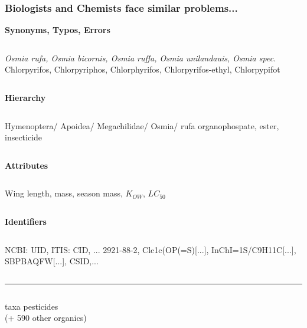 \documentclass[12pt, t, draft]{beamer}
\begin{document}
\begin{frame}
\frametitle{Biologists and Chemists face similar problems...}
\footnotesize

\centering
\textbf{\textcolor{hilight}{Synonyms, Typos, Errors}}
\begin{columns}[t]
\emph{Osmia rufa, Osmia bicornis, Osmia ruffa, Osmia unilandauis, Osmia spec.} 
Chlorpyrifos, Chlorpyriphos, Chlorphyrifos, Chlorpyrifos-ethyl, Chlorpypifot
\end{columns}
\pause


\centering
\textbf{\textcolor{hilight}{Hierarchy}}
\begin{columns}[t]
Hymenoptera/ Apoidea/ Megachilidae/ Osmia/ rufa 
organophospate, ester, insecticide
\end{columns}
\pause

\centering
\textbf{\textcolor{hilight}{Attributes}}
\begin{columns}[t]
Wing length, mass, season 
mass, $K_{OW}$, $LC_{50}$
\end{columns}
\pause

\centering
\textbf{\textcolor{hilight}{Identifiers}}
\begin{columns}[t]
NCBI: UID, ITIS: CID, ... 
2921-88-2, Clc1c(OP(=S)[...], InChI=1S/C9H11C[...], SBPBAQFW[...], CSID,...
\end{columns}
\vspace{0.8em}
\pause

\rule{\textwidth}{1pt}
\vspace{0.1em}

\begin{columns}[t]
 taxa
 pesticides \\ (+ 590 other organics)
\end{columns}
\end{frame}
\end{document}

